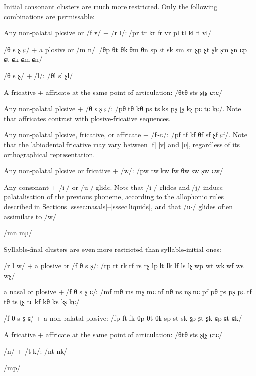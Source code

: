 \documentclass[grammar]{subfiles}
\begin{document}

  Initial consonant clusters are much more restricted. Only the following combinations are permissable:

  \begin{itemize*}
    \item Any non-palatal plosive or /f v/ + /r l/: /pr tr kr fr vr pl tl kl fl vl/ 
    \item /θ s ʂ ɕ/ + a plosive or /m n/: /θp θt θk θm θn sp st sk sm sn ʂp ʂt ʂk ʂm ʂn ɕp ɕt ɕk ɕm ɕn/
    \item /θ s ʂ/ + /l/: /θl sl ʂl/
    \item A fricative + affricate at the same point of articulation: /θtθ sts ʂʈʂ ɕtɕ/
    \item Any non-palatal plosive + /θ s ʂ ɕ/: /pθ tθ kθ ps ts ks pʂ ʈʂ kʂ pɕ tɕ kɕ/. Note that affricates contrast with plosive-fricative sequences.
    \item Any non-palatal plosive, fricative, or affricate + /f\textasciitilde ʋ/: /pf tf kf θf sf ʂf ɕf/. Note that the labiodental fricative may vary between [f] [v] and [ʋ], regardless of its orthographical representation.
    \item Any non-palatal plosive or fricative + /w/: /pw tw kw fw θw sw ʂw ɕw/
    \item Any consonant + /i-/ or /u-/ glide. Note that /i-/ glides and /j/ induce palatalisation of the previous phoneme, according to the allophonic rules described in Sections \ref{sssec:nasals}–\ref{sssec:liquids}, and that /u-/ glides often assimilate to /w/
    \item /mn mɲ/
  \end{itemize*}

  Syllable-final clusters are even more restricted than syllable-initial ones:

  \begin{itemize*}
    \item /r l w/ + a plosive or /f θ s ʂ/: /rp rt rk rf rs rʂ lp lt lk lf ls lʂ wp wt wk wf ws wʂ/
    \item a nasal or plosive + /f θ s ʂ ɕ/: /mf mθ ms mʂ mɕ nf nθ ns nʂ nɕ pf pθ ps pʂ pɕ tf tθ ts ʈʂ tɕ kf kθ ks kʂ kɕ/
    \item /f θ s ʂ ɕ/ + a non-palatal plosive: /fp ft fk θp θt θk sp st sk ʂp ʂt ʂk ɕp ɕt ɕk/
    \item A fricative + affricate at the same point of articulation: /θtθ sts ʂʈʂ ɕtɕ/
    \item /n/ + /t k/: /nt nk/
    \item /mp/
  \end{itemize*}
\end{document}
